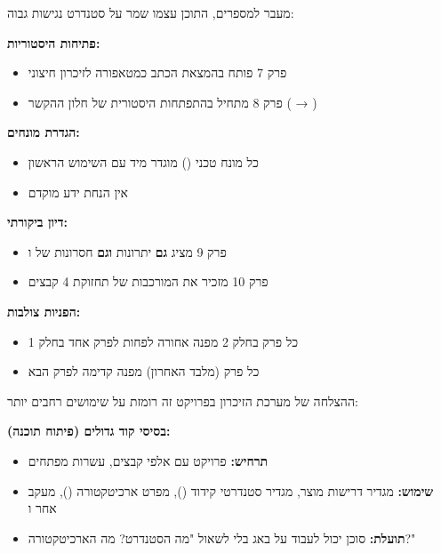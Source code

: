 
מעבר למספרים, התוכן עצמו שמר על סטנדרט נגישות גבוה:

\textbf{פתיחות היסטוריות:}
\begin{itemize}
  \item פרק \num{7} פותח בהמצאת הכתב כמטאפורה לזיכרון חיצוני
  \item פרק \num{8} מתחיל בהתפתחות היסטורית של חלון ההקשר ( → )
\end{itemize}

\textbf{הגדרת מונחים:}
\begin{itemize}
  \item כל מונח טכני () מוגדר מיד עם השימוש הראשון
  \item אין הנחת ידע מוקדם
\end{itemize}

\textbf{דיון ביקורתי:}
\begin{itemize}
  \item פרק \num{9} מציג \textbf{גם} יתרונות \textbf{וגם} חסרונות של  ו
  \item פרק \num{10} מזכיר את המורכבות של תחזוקת \num{4} קבצים
\end{itemize}

\textbf{הפניות צולבות:}
\begin{itemize}
  \item כל פרק בחלק \num{2} מפנה אחורה לפחות לפרק אחד בחלק \num{1}
  \item כל פרק (מלבד האחרון) מפנה קדימה לפרק הבא
\end{itemize}


ההצלחה של מערכת הזיכרון בפרויקט זה רומזת על שימושים רחבים יותר:

\textbf{בסיסי קוד גדולים (פיתוח תוכנה):}
\begin{itemize}
  \item \textbf{תרחיש:} פרויקט  עם אלפי קבצים, עשרות מפתחים
  \item \textbf{שימוש:}  מגדיר דרישות מוצר,  מגדיר סטנדרטי קידוד (),  מפרט ארכיטקטורה (),  מעקב אחר  ו
  \item \textbf{תועלת:} סוכן  יכול לעבוד על באג בלי לשאול "מה הסטנדרט? מה הארכיטקטורה?"
\end{itemize}

